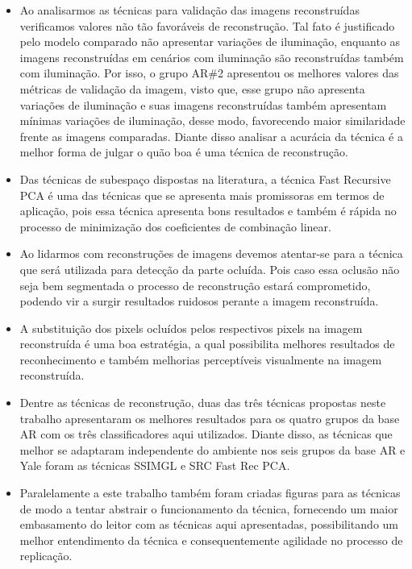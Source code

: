 \begin{itemize}

\item Ao analisarmos as técnicas para validação das imagens reconstruídas verificamos valores não tão favoráveis de reconstrução. Tal fato é justificado pelo modelo comparado não apresentar variações de iluminação, enquanto as imagens reconstruídas em cenários com iluminação são reconstruídas também com iluminação. Por isso, o grupo AR\#2 apresentou os melhores valores das métricas de validação da imagem, visto que, esse grupo não apresenta variações de iluminação e suas imagens reconstruídas também apresentam mínimas variações de iluminação, desse modo, favorecendo maior similaridade frente as imagens comparadas. Diante disso analisar a acurácia da técnica é a melhor forma de julgar o quão boa é uma técnica de reconstrução.

\item Das técnicas de subespaço dispostas na literatura, a técnica Fast Recursive PCA é uma das técnicas que se apresenta mais promissoras em termos de aplicação, pois essa técnica apresenta bons resultados e também é rápida no processo de minimização dos coeficientes de combinação linear.

\item Ao lidarmos com reconstruções de imagens devemos atentar-se para a técnica que será utilizada para detecção da parte ocluída. Pois caso essa oclusão não seja bem segmentada o processo de reconstrução estará comprometido, podendo vir a surgir resultados ruidosos perante a imagem reconstruída.

\item A substituição dos pixels ocluídos pelos respectivos pixels na imagem reconstruída é uma boa estratégia, a qual possibilita melhores resultados de reconhecimento e também melhorias perceptíveis visualmente na imagem reconstruída.

\item Dentre as técnicas de reconstrução, duas das três técnicas propostas neste trabalho apresentaram os melhores resultados para os quatro grupos da base AR com os três classificadores aqui utilizados. Diante disso, as técnicas que melhor se adaptaram independente do ambiente nos seis grupos da base AR e Yale foram as técnicas SSIMGL e SRC Fast Rec PCA.

\item Paralelamente a este trabalho também foram criadas figuras para as técnicas de modo a tentar abstrair o funcionamento da técnica, fornecendo um maior embasamento do leitor com as técnicas aqui apresentadas, possibilitando um melhor entendimento da técnica e consequentemente agilidade no processo de replicação.



\end{itemize}

